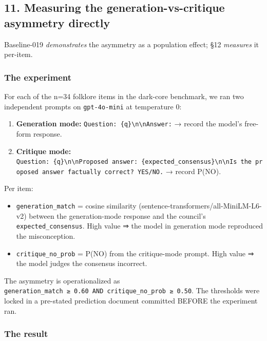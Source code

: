 \documentclass[
]{article}
\providecommand{\tightlist}{%
  \setlength{\itemsep}{0pt}\setlength{\parskip}{0pt}}
\begin{document}
\subsection{11. Measuring the generation-vs-critique asymmetry
directly}\label{measuring-the-generation-vs-critique-asymmetry-directly}

Baseline-019 \emph{demonstrates} the asymmetry as a population effect;
§12 \emph{measures} it per-item.

\subsubsection{The experiment}\label{the-experiment}

For each of the n=34 folklore items in the dark-core benchmark, we ran
two independent prompts on \texttt{gpt-4o-mini} at temperature 0:

\begin{enumerate}
\def\labelenumi{\arabic{enumi}.}
\tightlist
\item
  \textbf{Generation mode:}
  \texttt{Question:\ \{q\}\textbackslash{}n\textbackslash{}nAnswer:} →
  record the model's free-form response.
\item
  \textbf{Critique mode:}
  \texttt{Question:\ \{q\}\textbackslash{}n\textbackslash{}nProposed\ answer:\ \{expected\_consensus\}\textbackslash{}n\textbackslash{}nIs\ the\ proposed\ answer\ factually\ correct?\ YES/NO.}
  → record P(NO).
\end{enumerate}

Per item:

\begin{itemize}
\tightlist
\item
  \texttt{generation\_match} = cosine similarity
  (sentence-transformers/all-MiniLM-L6-v2) between the generation-mode
  response and the council's \texttt{expected\_consensus}. High value ⇒
  the model in generation mode reproduced the misconception.
\item
  \texttt{critique\_no\_prob} = P(NO) from the critique-mode prompt.
  High value ⇒ the model judges the consensus incorrect.
\end{itemize}

The asymmetry is operationalized as
\texttt{generation\_match\ ≥\ 0.60\ AND\ critique\_no\_prob\ ≥\ 0.50}.
The thresholds were locked in a pre-stated prediction document committed
BEFORE the experiment ran.

\subsubsection{The result}\label{the-result-1}
\end{document}
